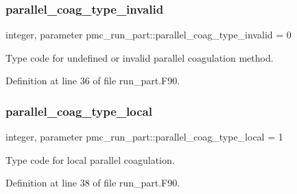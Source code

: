 \subsubsection{\texorpdfstring{parallel\+\_\+coag\+\_\+type\+\_\+invalid}{parallel\_coag\_type\_invalid}}
{\footnotesize\ttfamily integer, parameter pmc\+\_\+run\+\_\+part\+::parallel\+\_\+coag\+\_\+type\+\_\+invalid = 0}



Type code for undefined or invalid parallel coagulation method. 



Definition at line 36 of file run\+\_\+part.\+F90.

\mbox{\label{namespacepmc__run__part_a17a6185240300cc792ac0542cfcf0437}} 
\subsubsection{\texorpdfstring{parallel\+\_\+coag\+\_\+type\+\_\+local}{parallel\_coag\_type\_local}}
{\footnotesize\ttfamily integer, parameter pmc\+\_\+run\+\_\+part\+::parallel\+\_\+coag\+\_\+type\+\_\+local = 1}



Type code for local parallel coagulation. 



Definition at line 38 of file run\+\_\+part.\+F90.

